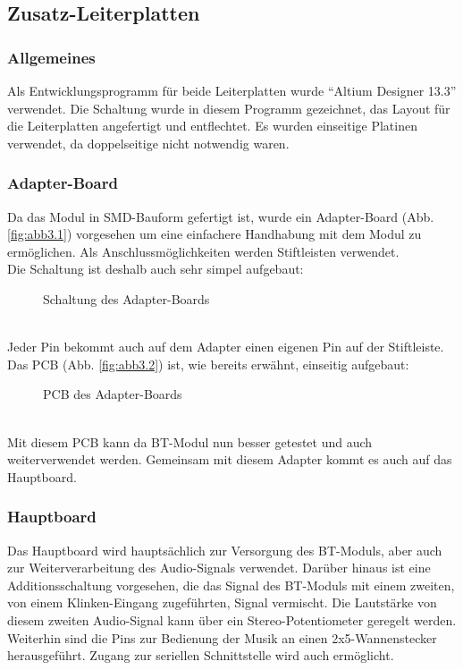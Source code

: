 \subsection{Zusatz-Leiterplatten}
\subsubsection{Allgemeines}
Als Entwicklungsprogramm für beide Leiterplatten wurde  \enquote{Altium Designer 13.3} verwendet. Die Schaltung wurde in diesem Programm gezeichnet, das Layout für die Leiterplatten angefertigt und entflechtet. Es wurden einseitige Platinen verwendet, da doppelseitige nicht notwendig waren.


\subsubsection{Adapter-Board}
Da das Modul in SMD-Bauform gefertigt ist, wurde ein Adapter-Board (Abb. \ref{fig:abb3.1}) vorgesehen um eine einfachere Handhabung mit dem Modul zu ermöglichen. Als Anschlussmöglichkeiten werden Stiftleisten verwendet.\\
Die Schaltung ist deshalb auch sehr simpel aufgebaut:
\begin{figure} [h]
	\centering
	\caption{Schaltung des Adapter-Boards}
\end{figure} \\
Jeder Pin bekommt auch auf dem Adapter einen eigenen Pin auf der Stiftleiste.
\newpage
Das PCB (Abb. \ref{fig:abb3.2}) ist, wie bereits erwähnt, einseitig aufgebaut:
\begin{figure} [h]
	\centering
	\caption{PCB des Adapter-Boards}
\end{figure} \\
Mit diesem PCB kann da BT-Modul nun besser getestet und auch weiterverwendet werden. Gemeinsam mit diesem Adapter kommt es auch auf das Hauptboard.
\newpage


\subsubsection{Hauptboard}
Das Hauptboard wird hauptsächlich zur Versorgung des BT-Moduls, aber auch zur Weiterverarbeitung des Audio-Signals verwendet. Darüber hinaus ist eine Additionsschaltung vorgesehen, die das Signal des BT-Moduls mit einem zweiten, von einem Klinken-Eingang zugeführten, Signal vermischt. Die Lautstärke von diesem zweiten Audio-Signal kann über ein Stereo-Potentiometer geregelt werden. \\
Weiterhin sind die Pins zur Bedienung der Musik an einen 2x5-Wannenstecker herausgeführt. Zugang zur seriellen Schnittstelle wird auch ermöglicht.

